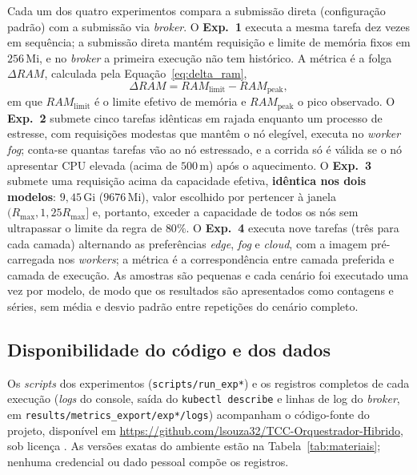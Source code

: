 \documentclass[11pt,a4paper]{article}
\newcommand{\gi}[1]{\ensuremath{#1}\,Gi}
\newcommand{\mi}[1]{\ensuremath{#1}\,Mi}
\begin{document}
Cada um dos quatro experimentos compara a submissão direta (configuração padrão)
com a submissão via \textit{broker}. O \textbf{Exp.~1} executa a mesma
tarefa dez vezes em sequência; a submissão direta mantém requisição e limite
de memória fixos em \mi{256}, e no \textit{broker} a primeira execução não
tem histórico. A métrica é a folga $\Delta RAM$, calculada pela
Equação~\eqref{eq:delta_ram},
\begin{equation}
  \Delta RAM = RAM_{\mathrm{limit}} - RAM_{\mathrm{peak}},
  \label{eq:delta_ram}
\end{equation}
em que $RAM_{\mathrm{limit}}$ é o limite efetivo de memória e
$RAM_{\mathrm{peak}}$ o pico observado. O \textbf{Exp.~2} submete cinco tarefas idênticas em rajada enquanto um processo de
estresse, com requisições modestas que mantêm o nó elegível, executa no
\textit{worker} \textit{fog}; conta-se quantas tarefas vão ao nó
estressado, e a corrida só é válida se o nó apresentar CPU elevada (acima de
$500$\,m) após o aquecimento. O \textbf{Exp.~3} submete uma requisição
acima da capacidade efetiva, \textbf{idêntica nos dois modelos}: \gi{9,45}
(\mi{9676}), valor escolhido por pertencer à janela $(R_{\max}, 1{,}25R_{\max}]$
e, portanto, exceder a capacidade de todos os nós sem ultrapassar o limite da
regra de $80\%$. O \textbf{Exp.~4} executa nove tarefas (três para cada camada) alternando as
preferências \textit{edge}, \textit{fog} e \textit{cloud}, com a imagem
pré-carregada nos \textit{workers}; a métrica é a correspondência entre
camada preferida e camada de execução. As amostras são pequenas e cada cenário foi executado uma vez por modelo, de modo
que os resultados são apresentados como contagens e séries, sem média e
desvio padrão entre repetições do cenário completo.

\subsection{Disponibilidade do código e dos dados}

Os \textit{scripts} dos experimentos (\texttt{scripts/\allowbreak run\_\allowbreak exp*}) e os
registros completos de cada execução (\textit{logs} do console, saída do
\texttt{kubectl describe} e linhas de log do \textit{broker}, em
\texttt{results/\allowbreak metrics\_\allowbreak export/\allowbreak exp*/\allowbreak logs}) acompanham o código-fonte do
projeto, disponível em
\url{https://github.com/lsouza32/TCC-Orquestrador-Hibrido}, sob licença
. As versões exatas do ambiente estão na
Tabela~\ref{tab:materiais}; nenhuma credencial ou dado pessoal compõe os
registros.
\end{document}
